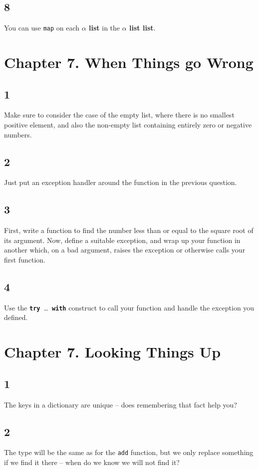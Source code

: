\documentclass[]{book}
\begin{document}
\subsection*{8}
You can use \texttt{map} on each \textbf{\textsf{$\alpha$ list}} in the \textbf{\textsf{$\alpha$ list list}}.

\section*{Chapter 7. When Things go Wrong}

\subsection*{1}
Make sure to consider the case of the empty list, where there is no smallest positive element, and also the non-empty list containing entirely zero or negative numbers.

\subsection*{2}
Just put an exception handler around the function in the previous question.

\subsection*{3}
First, write a function to find the number less than or equal to the square root of its argument. Now, define a suitable exception, and wrap up your function in another which, on a bad argument, raises the exception or otherwise calls your first function.

\subsection*{4}
Use the \textbf{\texttt{try}}\ \ldots\ \textbf{\texttt{with}} construct to call your function and handle the exception you defined.

\section*{Chapter 7. Looking Things Up}
\subsection*{1}
The keys in a dictionary are unique -- does remembering that fact help you?

\subsection*{2}
The type will be the same as for the \texttt{add} function, but we only replace something if we find it there -- when do we know we will not find it?
\end{document}
